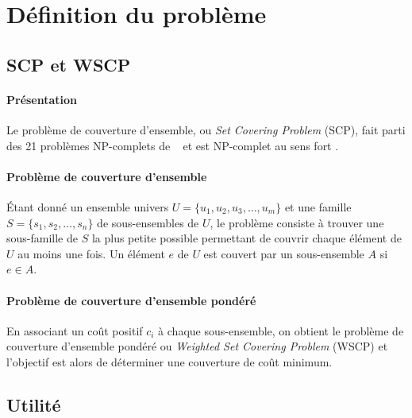 \documentclass[12pt,letterpaper,twoside]{article}
\begin{document}
	\maketitle{}
	{\footnotesize
	\tableofcontents{}}
	\newpage{}
	\section{Définition du problème}
		\subsection{SCP et WSCP}
			\paragraph*{Présentation\\}
				Le problème de couverture d'ensemble, ou \emph{Set Covering Problem} (SCP),
				fait parti des 21 problèmes NP-complets de \citeauthor{Karp1972}~\cite{Karp1972}
				et est NP-complet au sens fort \cite{garey2002computers}.
			\paragraph*{Problème de couverture d'ensemble\\}
				Étant donné un ensemble univers \(U = \{u_1, u_2, u_3, \dots, u_m\}\) et une famille \(S = \{s_1, s_2, \dots, s_n\}\) de sous-ensembles de \(U\),
				le problème consiste à trouver une sous-famille de \(S\) la plus petite possible permettant de couvrir chaque élément de \(U\)
				au moins une fois. Un élément \(e\) de \(U\) est couvert par un sous-ensemble \(A\) si \(e \in A\).
			\paragraph*{Problème de couverture d'ensemble pondéré\\}
				En associant un coût positif \(c_i\) à chaque sous-ensemble, on obtient le problème de couverture d'ensemble pondéré ou \emph{Weighted Set Covering Problem} (WSCP) et	l'objectif est alors de déterminer une couverture de coût minimum.~\cite{Vazirani2003}
		\subsection{Utilité}
\end{document}
